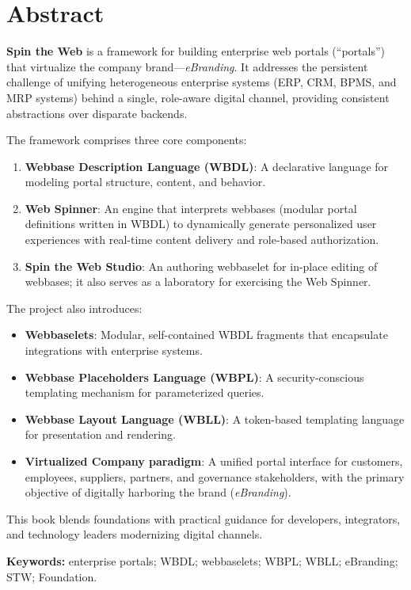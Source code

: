 
\chapter*{Abstract}

\textbf{Spin the Web} is a framework for building enterprise web portals (``portals'') that virtualize the company brand—\textit{eBranding}. It addresses the persistent challenge of unifying heterogeneous enterprise systems (ERP, CRM, BPMS, and MRP systems) behind a single, role-aware digital channel, providing consistent abstractions over disparate backends.

The framework comprises three core components:
\begin{enumerate}
\item \textbf{Webbase Description Language (WBDL)}: A declarative language for modeling portal structure, content, and behavior.
\item \textbf{Web Spinner}: An engine that interprets webbases (modular portal definitions written in WBDL) to dynamically generate personalized user experiences with real-time content delivery and role-based authorization.
\item \textbf{Spin the Web Studio}: An authoring webbaselet for in-place editing of webbases; it also serves as a laboratory for exercising the Web Spinner.
\end{enumerate}

The project also introduces:
\begin{itemize}
\item \textbf{Webbaselets}: Modular, self-contained WBDL fragments that encapsulate integrations with enterprise systems.
\item \textbf{Webbase Placeholders Language (WBPL)}: A security-conscious templating mechanism for parameterized queries.
\item \textbf{Webbase Layout Language (WBLL)}: A token-based templating language for presentation and rendering.
\item \textbf{Virtualized Company paradigm}: A unified portal interface for customers, employees, suppliers, partners, and governance stakeholders, with the primary objective of digitally harboring the brand (\textit{eBranding}).
\end{itemize}

This book blends foundations with practical guidance for developers, integrators, and technology leaders modernizing digital channels.

\textbf{Keywords:} enterprise portals; WBDL; webbaselets; WBPL; WBLL; eBranding; STW; Foundation.



\clearpage
